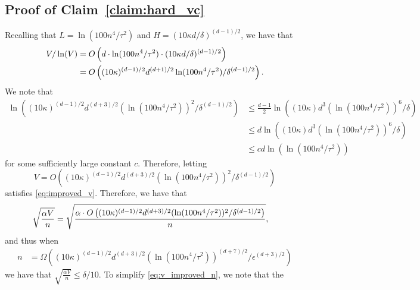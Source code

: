 \documentclass[final,12pt]{colt2018}
\newtheorem{informal theorem}[theorem]{Theorem (informal statement)}
\newcommand{\eps}{\epsilon}
\begin{document}
\subsection{ {Proof of Claim~\ref{claim:hard_vc}}}
Recalling that $L= \ln(100 n^4/\tau^2)$ and $H = (10 \kappa d / \delta)^{(d-1)/2}$, we have that
\begin{align}
V / \ln(V) &= O\left( d \cdot \ln(100 n^4/\tau^2) \cdot (10 \kappa d / \delta)^{(d-1)/2} \right) \notag \\
&= O\left( (10 \kappa)^{(d-1)/2} d^{(d+1)/2} \ln(100 n^4/\tau^2) / \delta^{(d-1)/2} \right). \label{eq:improved_v}
\end{align}
We note that
\begin{align*}
\ln\left( (10 \kappa)^{(d-1)/2} d^{(d+3)/2} (\ln(100 n^4/\tau^2))^2 / \delta^{(d-1)/2} \right)
&\leq \frac{d-1}{2} \ln\left( (10 \kappa) d^{3} (\ln(100 n^4/\tau^2))^{6} / \delta \right) \\
&\leq d \ln\left( (10 \kappa) d^{3} (\ln(100 n^4/\tau^2))^{6} / \delta \right) \\
&\leq c d \ln( \ln(100 n^4/\tau^2) )
\end{align*}
for some sufficiently large constant $c$. 
Therefore, letting
\[
V = O\left( (10 \kappa)^{(d-1)/2} d^{(d+3)/2} (\ln(100 n^4/\tau^2))^2 / \delta^{(d-1)/2} \right)
\]
satisfies \eqref{eq:improved_v}.
Therefore, we have that 
\begin{align}
\sqrt{\frac{\alpha V}{n}}
&= \sqrt{\frac{\alpha \cdot O\left( (10 \kappa)^{(d-1)/2} d^{(d+3)/2} (\ln(100 n^4/\tau^2))^2 / \delta^{(d-1)/2} \right) }{ n } }, \notag
\end{align}
and thus when
\begin{align}
n &= \Omega\left( (10 \kappa)^{(d-1)/2} d^{(d+3)/2} (\ln(100 n^4/\tau^2))^{(d+7)/2} / \eps^{(d+3)/2} \right) \label{eq:v_improved_n}
\end{align}
we have that $\sqrt{\frac{\alpha V}{n}} \leq \delta/10$.
To simplify \eqref{eq:v_improved_n}, we note that the 
\end{document}
